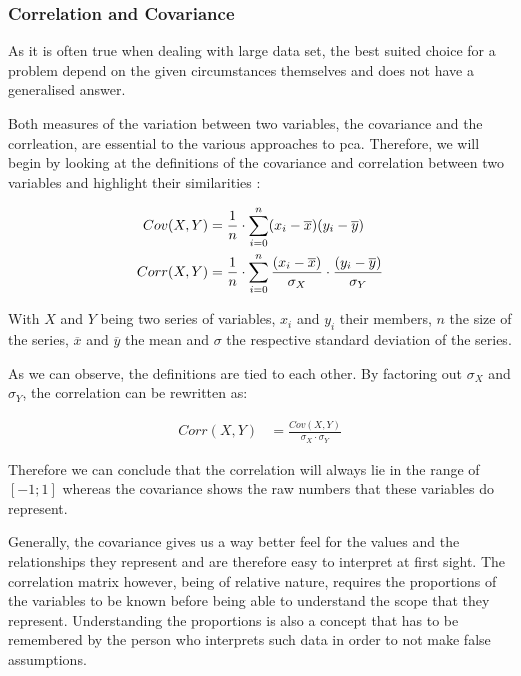 \clearpage



\subsubsection{Correlation and Covariance} \label{section:correlationANDcovariance}

As it is often true when dealing with large data set, the best suited choice for a problem depend on the given circumstances themselves and does not have a generalised answer. 

Both measures of the variation between two variables, the covariance and the corrleation, are essential to the various approaches to \gls{pca}.
Therefore, we will begin by looking at the definitions of the covariance and correlation between two variables and highlight their similarities \cite{downey2011think}:


\vspace{-28mm}
{
\begin{align}
	\label{formula:covariance}
	Cov(X,Y) &= \frac{1}{n} \cdot \displaystyle\sum_{i=0}^{n} (x_i - \overline{x})(y_i - \overline{y})\bigskip
	\\
	\label{formula:correlation}
	Corr(X,Y) &= \frac{1}{n} \cdot \displaystyle\sum_{i=0}^{n} \frac{(x_i - \overline{x})}{\sigma_X}\cdot\frac{(y_i - \overline{y})}{\sigma_Y}
\end{align}
}

\vspace{-10mm}
With $X$ and $Y$ being two series of variables, $x_i$ and $y_i$ their members, $n$ the size of the series, $\overline{x}$ and $\overline{y}$ the mean and $\sigma$ the respective standard deviation of the series.

As we can observe, the definitions are tied to each other. By factoring out $\sigma_X$ and $\sigma_Y$, the correlation can be rewritten as:

\vspace{-6mm}
\begin{align}
	\label{formula:covarianceFTcorrelation}
	Corr(X,Y) &= \frac{Cov(X,Y)}{\sigma_X \cdot \sigma_Y}
\end{align}

Therefore we can conclude that the correlation will always lie in the range of $[-1;1]$ whereas the covariance shows the raw numbers that these variables do represent.\bigskip


Generally, the covariance gives us a way better feel for the values and the relationships they represent and are therefore easy to interpret at first sight.
The correlation matrix however, being of relative nature, requires the proportions of the variables to be known before being able to understand the scope that they represent.
Understanding the proportions is also a concept that has to be remembered by the person who interprets such data in order to not make false assumptions.

